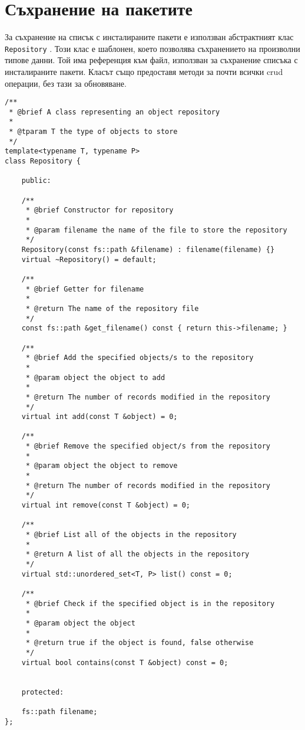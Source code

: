 \section{Съхранение на пакетите}

За съхранение на списък с инсталираните пакети е използван абстрактният клас
\texttt{Repository} . Този клас е шаблонен, което
позволява съхранението на произволни типове данни. Той има референция към файл,
използван за съхранение списъка с инсталираните пакети. Класът също предоставя
методи за почти всички \acrshort{crud} операции, без тази за обновяване.

\begin{lstlisting}[style=cpp,
				   caption=Абстрактен клас за хранилище,
				   label={lst:repository}]
/**
 * @brief A class representing an object repository
 * 
 * @tparam T the type of objects to store
 */
template<typename T, typename P>
class Repository {

	public:

	/**
	 * @brief Constructor for repository
	 * 
	 * @param filename the name of the file to store the repository
	 */
	Repository(const fs::path &filename) : filename(filename) {}
	virtual ~Repository() = default;

	/**
	 * @brief Getter for filename
	 * 
	 * @return The name of the repository file
	 */
	const fs::path &get_filename() const { return this->filename; }

	/**
	 * @brief Add the specified objects/s to the repository
	 * 
	 * @param object the object to add
	 * 
	 * @return The number of records modified in the repository
	 */
	virtual int add(const T &object) = 0;

	/**
	 * @brief Remove the specified object/s from the repository
	 * 
	 * @param object the object to remove
	 * 
	 * @return The number of records modified in the repository
	 */
	virtual int remove(const T &object) = 0;

	/**
	 * @brief List all of the objects in the repository
	 * 
	 * @return A list of all the objects in the repository
	 */
	virtual std::unordered_set<T, P> list() const = 0;

	/**
	 * @brief Check if the specified object is in the repository
	 * 
	 * @param object the object
	 * 
	 * @return true if the object is found, false otherwise
	 */
	virtual bool contains(const T &object) const = 0;


	protected:

	fs::path filename;
};
\end{lstlisting}

